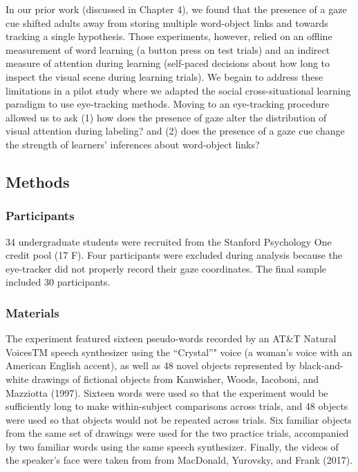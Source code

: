 \documentclass[man,floatsintext]{apa6}
\begin{document}
In our prior work (discussed in Chapter 4), we found that the presence
of a gaze cue shifted adults away from storing multiple word-object
links and towards tracking a single hypothesis. Those experiments,
however, relied on an offline measurement of word learning (a button
press on test trials) and an indirect measure of attention during
learning (self-paced decisions about how long to inspect the visual
scene during learning trials). We begain to address these limitations in
a pilot study where we adapted the social cross-situational learning
paradigm to use eye-tracking methods. Moving to an eye-tracking
procedure allowed us to ask (1) how does the presence of gaze alter the
distribution of visual attention during labeling? and (2) does the
presence of a gaze cue change the strength of learners' inferences about
word-object links?

\hypertarget{methods-1}{%
\subsection{Methods}\label{methods-1}}

\hypertarget{participants-1}{%
\subsubsection{Participants}\label{participants-1}}

34 undergraduate students were recruited from the Stanford Psychology
One credit pool (17 F). Four participants were excluded during analysis
because the eye-tracker did not properly record their gaze coordinates.
The final sample included 30 participants.

\hypertarget{materials-1}{%
\subsubsection{Materials}\label{materials-1}}

The experiment featured sixteen pseudo-words recorded by an AT\&T
Natural VoicesTM speech synthesizer using the \enquote{Crystal}" voice
(a woman's voice with an American English accent), as well as 48 novel
objects represented by black-and-white drawings of fictional objects
from Kanwisher, Woods, Iacoboni, and Mazziotta (1997). Sixteen words
were used so that the experiment would be sufficiently long to make
within-subject comparisons across trials, and 48 objects were used so
that objects would not be repeated across trials. Six familiar objects
from the same set of drawings were used for the two practice trials,
accompanied by two familiar words using the same speech synthesizer.
Finally, the videos of the speaker's face were taken from from
MacDonald, Yurovsky, and Frank (2017).
\end{document}
